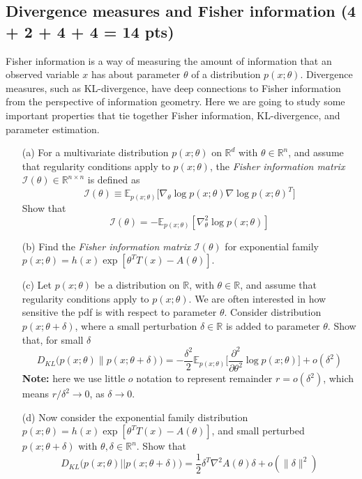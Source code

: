 \subsection{Divergence measures and Fisher information (4 + 2 + 4 + 4 = 14 pts)}
Fisher information is a way of measuring the amount of information that an observed variable $x$ has about parameter $\theta$ of a distribution $p(x; \theta)$. Divergence measures, such as KL-divergence, have deep connections to Fisher information from the perspective of information geometry. Here we are going to study some important properties that tie together Fisher information, KL-divergence, and parameter estimation. 
\begin{itemize}
\item[(a)] For a multivariate distribution $p(x; \theta)$ on $\mathbb{R}^d$ with $\theta \in \mathbb{R}^n$, and assume that regularity conditions apply to $p(x;\theta)$, the \textit{Fisher information matrix} $\mathcal{I}(\theta) \in \mathbb{R}^{n \times n}$ is defined as $$\mathcal{I}(\theta) \equiv \mathbb{E}_{p(x;\theta)}\big[ \nabla_{\theta} \log p(x;\theta) \nabla \log p(x;\theta)^T\big]$$ Show that  $$ \mathcal{I}(\theta) = -\mathbb{E}_{p(x;\theta)} [\nabla_{\theta}^2 \log p(x;\theta)]$$ 
\item[(b)] Find the \textit{Fisher information matrix} $\mathcal{I}(\theta)$ for exponential family $p(x;\theta) = h(x)\exp[\theta^TT(x) - A(\theta)]$.
\item[(c)] Let $p(x;\theta)$ be a distribution on $\mathbb{R}$, with $\theta \in \mathbb{R}$, and assume that regularity conditions apply to $p(x;\theta)$. We are often interested in how sensitive the pdf is with respect to parameter $\theta$. Consider distribution $p(x; \theta+\delta)$, where a small perturbation $\delta \in \mathbb{R}$ is added to parameter $\theta$. Show that, for small $\delta$ $$D_{KL}\big(p(x;\theta) \| p(x;\theta+\delta)\big) = -\frac{\delta^2}{2} \mathbb{E}_{p(x;\theta)}\big[\frac{\partial^2}{\partial \theta^2} \log p(x;\theta)\big] + o(\delta^2)$$
\textbf{Note:} here we use little $o$ notation to represent remainder $r = o(\delta^2)$, which means $r / \delta^2 \rightarrow 0$, as $\delta \rightarrow 0$. 
\item[(d)] Now consider the exponential family distribution $p(x;\theta) = h(x)\exp[\theta^TT(x) - A(\theta)]$, and small perturbed $p(x; \theta+\delta)$ with $\theta, \delta \in \mathbb{R}^n$.  Show that $$D_{KL}\big(p(x; \theta)||p(x; \theta+\delta)\big) = \frac{1}{2} \delta^T\nabla^2A(\theta)\delta + o(\|\delta\|^2)$$
\end{itemize}






